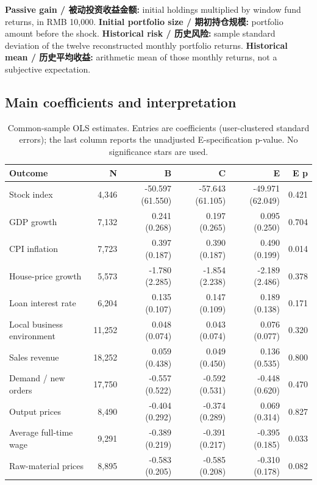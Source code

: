 \noindent\textbf{Passive gain / 被动投资收益金额:} initial holdings multiplied by window fund returns, in RMB 10,000. \textbf{Initial portfolio size / 期初持仓规模:} portfolio amount before the shock. \textbf{Historical risk / 历史风险:} sample standard deviation of the twelve reconstructed monthly portfolio returns. \textbf{Historical mean / 历史平均收益:} arithmetic mean of those monthly returns, not a subjective expectation.
\subsection{Main coefficients and interpretation}
\begin{table}[H]
\centering
\small
\setlength{\tabcolsep}{4pt}
\caption{Common-sample OLS estimates. Entries are coefficients (user-clustered standard errors); the last column reports the unadjusted E-specification p-value. No significance stars are used.}
\begin{tabular}{lrrrrr}
\toprule
Outcome & N & B & C & E & E p \\
\midrule
Stock index & 4,346 & -50.597 (61.550) & -57.643 (61.105) & -49.971 (62.049) & 0.421 \\
GDP growth & 7,132 & 0.241 (0.268) & 0.197 (0.265) & 0.095 (0.250) & 0.704 \\
CPI inflation & 7,723 & 0.397 (0.187) & 0.390 (0.187) & 0.490 (0.199) & 0.014 \\
House-price growth & 5,573 & -1.780 (2.285) & -1.854 (2.238) & -2.189 (2.486) & 0.378 \\
Loan interest rate & 6,204 & 0.135 (0.107) & 0.147 (0.109) & 0.189 (0.138) & 0.171 \\
Local business environment & 11,252 & 0.048 (0.074) & 0.043 (0.074) & 0.076 (0.077) & 0.320 \\
Sales revenue & 18,252 & 0.059 (0.438) & 0.049 (0.450) & 0.136 (0.535) & 0.800 \\
Demand / new orders & 17,750 & -0.557 (0.522) & -0.592 (0.531) & -0.448 (0.620) & 0.470 \\
Output prices & 8,490 & -0.404 (0.292) & -0.374 (0.289) & 0.069 (0.314) & 0.827 \\
Average full-time wage & 9,291 & -0.389 (0.219) & -0.391 (0.217) & -0.395 (0.185) & 0.033 \\
Raw-material prices & 8,895 & -0.583 (0.205) & -0.585 (0.208) & -0.310 (0.178) & 0.082 \\
\bottomrule
\end{tabular}
\end{table}
